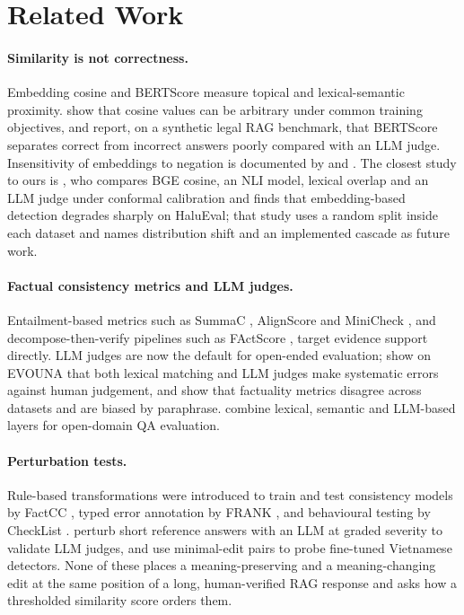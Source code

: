 \section{Related Work}
\label{sec:related}

\paragraph{Similarity is not correctness.}
Embedding cosine \citep{reimers2019sentence,xiao2023cpack} and BERTScore \citep{zhang2020bertscore} measure topical and lexical-semantic proximity. \citet{steck2024cosine} show that cosine values can be arbitrary under common training objectives, and \citet{silva2026semantic} report, on a synthetic legal RAG benchmark, that BERTScore separates correct from incorrect answers poorly compared with an LLM judge. Insensitivity of embeddings to negation is documented by \citet{cao2025semantic} and \citet{anschutz2023correct}. The closest study to ours is \citet{sinha2025semantic}, who compares BGE cosine, an NLI model, lexical overlap and an LLM judge under conformal calibration and finds that embedding-based detection degrades sharply on HaluEval; that study uses a random split inside each dataset and names distribution shift and an implemented cascade as future work.

\paragraph{Factual consistency metrics and LLM judges.}
Entailment-based metrics such as SummaC \citep{laban2022summac}, AlignScore \citep{zha2023alignscore} and MiniCheck \citep{tang2024minicheck}, and decompose-then-verify pipelines such as FActScore \citep{min2023factscore}, target evidence support directly. LLM judges \citep{liu2023geval,zheng2023judging} are now the default for open-ended evaluation; \citet{wang2023evaluating} show on EVOUNA that both lexical matching and LLM judges make systematic errors against human judgement, and \citet{godbole2025verify} show that factuality metrics disagree across datasets and are biased by paraphrase. \citet{rahnamoun2025multilayered} combine lexical, semantic and LLM-based layers for open-domain QA evaluation.

\paragraph{Perturbation tests.}
Rule-based transformations were introduced to train and test consistency models by FactCC \citep{kryscinski2020evaluating}, typed error annotation by FRANK \citep{pagnoni2021understanding}, and behavioural testing by CheckList \citep{ribeiro2020beyond}. \citet{gharsallah2026trust} perturb short reference answers with an LLM at graded severity to validate LLM judges, and \citet{nguyen2026accuracy} use minimal-edit pairs to probe fine-tuned Vietnamese detectors. None of these places a meaning-preserving and a meaning-changing edit at the same position of a long, human-verified RAG response and asks how a thresholded similarity score orders them.

